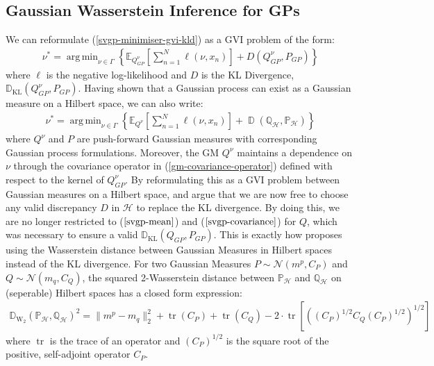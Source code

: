 \documentclass{article}
\newcommand{\KLD}{\operatorname{\mathbb{D}_{KL}}}
\newcommand{\D}{\operatorname{\mathbb{D}}}
\newcommand{\WD}{\operatorname{\mathbb{D}_{W_2}}}
\newcommand{\tr}{\operatorname{tr}}
\DeclareMathOperator*{\argmin}{arg\,min}
\numberwithin{equation}{section}
\begin{document}
\subsection{Gaussian Wasserstein Inference for GPs}
We can reformulate (\ref{svgp-minimiser-gvi-kld}) as a GVI problem of the form:
\begin{align}
    \label{svgp-gwi-gp}
    \nu^* = \argmin_{\nu \in \Gamma} \left\{ \mathbb{E}_{Q_{GP}^{\nu}}\left[\sum_{n=1}^N \ell(\nu, x_n)\right] + D(Q_{GP}^{\nu}, P_{GP})\right\}
\end{align}
where $\ell$ is the negative log-likelihood and $D$ is the KL Divergence, $\KLD(Q_{GP}^{\nu}, P_{GP})$. Having shown that a Gaussian process can exist as a Gaussian measure on a Hilbert space, we can also write:
\begin{align}
    \label{svgp-gwi-gm}
    \nu^* = \argmin_{\nu \in \Gamma} \left\{ \mathbb{E}_{Q^{\nu}}\left[\sum_{n=1}^N \ell(\nu, x_n)\right] + \D(\mathbb{Q}_{\mathcal{H}}, \mathbb{P}_{\mathcal{H}})\right\}
\end{align}
where $Q^{\nu}$ and $P$ are push-forward Gaussian measures with corresponding Gaussian process formulations. Moreover, the GM $Q^{\nu}$ maintains a dependence on $\nu$ through the covariance operator in (\ref{gm-covariance-operator}) defined with respect to the kernel of $Q_{GP}^{\nu}$. By reformulating this as a GVI problem between Gaussian measures on a Hilbert space, \cite{wild2022generalized} and \cite{knoblauch2022optimization} argue that we are now free to choose any valid discrepancy $D$ in $\mathcal{H}$ to replace the KL divergence. By doing this, we are no longer restricted to ($\ref{svgp-mean}$) and ($\ref{svgp-covariance}$) for $Q$, which was necessary to ensure a valid $\KLD(Q_{GP},  P_{GP})$. This is exactly how \cite{wild2022generalized} proposes using the Wasserstein distance between Gaussian Measures in Hilbert spaces instead of the KL divergence. For two Gaussian Measures $P \sim \mathcal{N}(m^p, C_P)$ and $Q \sim \mathcal{N}(m_q, C_Q)$, the squared 2-Wasserstein distance between $\mathbb{P}_{\mathcal{H}}$ and $\mathbb{Q}_{\mathcal{H}}$ on (seperable) Hilbert spaces has a closed form expression:
\begin{align}
    \label{wasserstein-distance}
    \WD \left(\mathbb{P}_{\mathcal{H}}, \mathbb{Q}_{\mathcal{H}}\right)^2 = \| m^p - m_q\|_2^2 + \tr(C_P) + \tr(C_Q) - 2 \cdot \tr \left[ \left( \left(C_P\right)^{1/2} C_Q \left(C_P\right)^{1/2}\right)^{1/2}\right]
\end{align}
where $\tr$ is the trace of an operator and $\left(C_P\right)^{1/2}$ is the square root of the positive, self-adjoint operator $C_P$.
\end{document}

